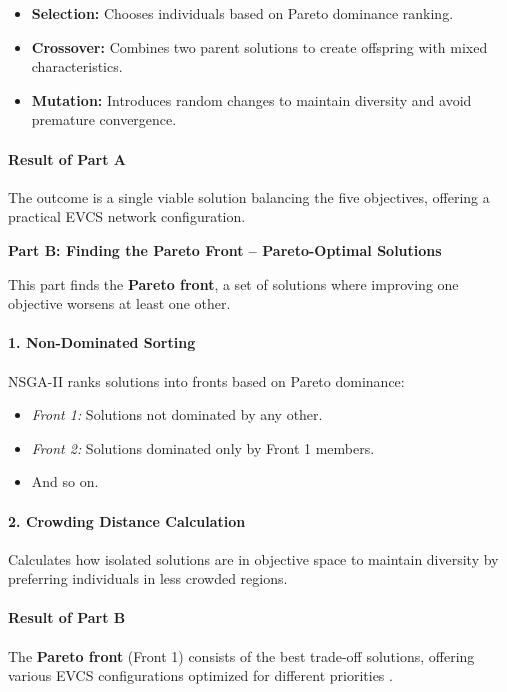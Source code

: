 \begin{itemize}
    \item \textbf{Selection:} Chooses individuals based on Pareto dominance ranking.
    \item \textbf{Crossover:} Combines two parent solutions to create offspring with mixed characteristics.
    \item \textbf{Mutation:} Introduces random changes to maintain diversity and avoid premature convergence.
\end{itemize}

\paragraph{Result of Part A}  
The outcome is a single viable solution balancing the five objectives, offering a practical EVCS network configuration.

\bigskip
\textbf{Part B: Finding the Pareto Front – Pareto-Optimal Solutions}

This part finds the \textbf{Pareto front}, a set of solutions where improving one objective worsens at least one other.

\paragraph{1. Non-Dominated Sorting}  
NSGA-II ranks solutions into fronts based on Pareto dominance:

\begin{itemize}
    \item \textit{Front 1:} Solutions not dominated by any other.
    \item \textit{Front 2:} Solutions dominated only by Front 1 members.
    \item And so on.
\end{itemize}

\paragraph{2. Crowding Distance Calculation}  
Calculates how isolated solutions are in objective space to maintain diversity by preferring individuals in less crowded regions.

\paragraph{Result of Part B}  
The \textbf{Pareto front} (Front 1) consists of the best trade-off solutions, offering various EVCS configurations optimized for different priorities \cite{A_Fast_and_Elitist_Multi_objective_Genetic_Algorithm_NSGA_II}.

